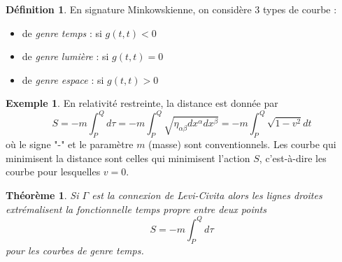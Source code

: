 \documentclass[a4paper,11pt]{report}
\theoremstyle{definition}
\theoremstyle{plain}
\newtheorem{thm}{Théorème}[chapter]
\theoremstyle{definition}
\newtheorem{defn}{Définition}[chapter]
\newtheorem{exmp}{Exemple}[chapter]
\theoremstyle{remark}
\begin{document}
            \begin{defn}
                En signature Minkowskienne, on considère 3 types de courbe :
                \begin{itemize}[label = \textbullet]
                    \item de \textit{genre temps} : si $g(t,t)<0$
                    \item de \textit{genre lumière} : si $g(t,t)=0$
                    \item de \textit{genre espace} : si $g(t,t)>0$
                \end{itemize}
            \end{defn}
            
            \begin{exmp}
                En relativité restreinte, la distance est donnée par
                \begin{equation}
                    S = -m\int_P^Qd\tau = -m\int_P^Q\sqrt{\eta_{\alpha\beta}dx^\alpha dx^\beta} = -m\int_P^Q\sqrt{1-v^2}dt
                \end{equation}
                où le signe "-" et le paramètre $m$ (masse) sont conventionnels. Les courbe qui minimisent la distance sont celles qui minimisent l'action $S$, c'est-à-dire les courbe pour lesquelles $v=0$.
            \end{exmp}
            
            \begin{thm}
                Si $\Gamma$ est la connexion de Levi-Civita alors les lignes droites extrémalisent  la fonctionnelle temps propre entre deux points
                \begin{equation}
                    S = -m\int_P^Qd\tau
                \end{equation}
                pour les courbes de genre temps.
            \end{thm}
            
\end{document}
